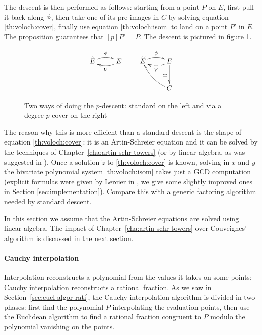 The descent is then performed as follows: starting from a point $P$ on
$E$, first pull it back along $\phi$, then take one of its
pre-images in $C$ by solving equation \eqref{th:voloch:cover}, finally
use equation \eqref{th:voloch:isom} to land on a point $P'$ in $E$.
The proposition guarantees that $[p]P' = P$. The descent is pictured
in figure \ref{fig:voloch}.

\begin{figure}
  \centering
  \[
  \xymatrix{\widetilde{E}\ar@/^/[r]^{\frobisog} & E\ar@/^/[l]^{V}}
  \qquad
  \xymatrix{
    \widetilde{E}\ar@/^/[r]^{\frobisog} & E\ar@/^/@{-->}[l]^{V}\ar[d]_{\simeq}\\
    & C\ar@/^/[ul]
  }
  \]
  
  \caption{Two ways of doing the $p$-descent: standard on the left and via a degree $p$ cover on the right}
  \label{fig:voloch}
\end{figure}


The reason why this is more efficient than a standard descent is the
shape of equation \eqref{th:voloch:cover}: it is an Artin-Schreier
equation and it can be solved by the techniques of
Chapter~\ref{cha:artin-schr-towers} (or by linear algebra, as was
suggested in \cite{couveignes96}). Once a solution $\tilde{z}$ to
\eqref{th:voloch:cover} is known, solving in $x$ and $y$ the bivariate
polynomial system \eqref{th:voloch:isom} takes just a GCD computation
(explicit formulas were given by Lercier in
\cite[$\S$6.2]{lercier-algorithmique}, we give some slightly improved
ones in Section \ref{sec:implementation}). Compare this with a generic
factoring algorithm needed by standard descent.

In this section we assume that the Artin-Schreier equations are solved
using linear algebra. The impact of
Chapter~\ref{cha:artin-schr-towers} over Couveignes' algorithm is
discussed in the next section.


\paragraph{Cauchy interpolation}
Interpolation reconstructs a polynomial from the values it takes on
some points; Cauchy interpolation reconstructs a rational fraction. As
we saw in Section~\ref{sec:eucl-algor-rati}, the Cauchy interpolation
algorithm is divided in two phases: first find the polynomial $P$
interpolating the evaluation points, then use the Euclidean algorithm
to find a rational fraction congruent to $P$ modulo the polynomial
vanishing on the points.

